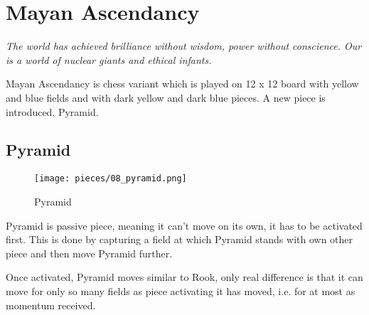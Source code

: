 

\chapter*{Mayan Ascendancy}
\label{ch:Mayan Ascendancy}

\begin{flushright}
\parbox{0.8\textwidth}{
\emph{The world has achieved brilliance without wisdom, power without
conscience. Our is a world of nuclear giants and ethical infants. \newline
{} } }
\end{flushright}

\noindent
Mayan Ascendancy is chess variant which is played on 12 x 12 board with
yellow and blue fields and with dark yellow and dark blue pieces.
A new piece is introduced, Pyramid.

\clearpage %

\section*{Pyramid}
\label{sec:Mayan Ascendancy/Pyramid}

\noindent
\begin{wrapfigure}[12]{l}{0.4\textwidth}
\centering
\texttt{[image: pieces/08\_pyramid.png]}
\caption{Pyramid}
\label{fig:08_pyramid}
\end{wrapfigure}
Pyramid is passive piece, meaning it can't move on its own, it has to be
activated first. This is done by capturing a field at which Pyramid stands
with own other piece and then move Pyramid further.

Once activated, Pyramid moves similar to Rook, only real difference is that
it can move for only so many fields as piece activating it has moved, i.e.
for at most as momentum received.

